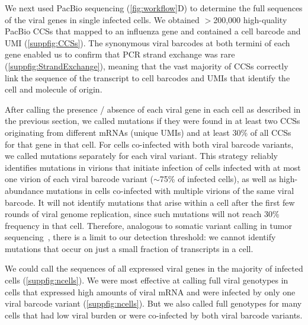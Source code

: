 \documentclass[]{asm-article}
\newcommand{\FIG}[1]{\autoref{fig:#1}}
\newcommand{\SUPPFIG}[1]{\autoref{suppfig:#1}}
\begin{document}
We next used PacBio sequencing (\FIG{workflow}D) to determine the full sequences of the viral genes in single infected cells.
We obtained $>$200,000 high-quality PacBio CCSs that mapped to an influenza gene and contained a cell barcode and UMI (\SUPPFIG{CCSs}).
The synonymous viral barcodes at both termini of each gene enabled us to confirm that PCR strand exchange was rare (\SUPPFIG{StrandExchange}), meaning that the vast majority of CCSs correctly link the sequence of the transcript to cell barcodes and UMIs that identify the cell and molecule of origin.

After calling the presence / absence of each viral gene in each cell as described in the previous section, we called mutations if they were found in at least two CCSs originating from different mRNAs (unique UMIs) and at least 30\% of all CCSs for that gene in that cell.
For cells co-infected with both viral barcode variants, we called mutations separately for each viral variant.
This strategy reliably identifies mutations in virions that initiate infection of cells infected with at most one virion of each viral barcode variant ($\sim$75\% of infected cells), as well as high-abundance mutations in cells co-infected with multiple virions of the same viral barcode.
It will not identify mutations that arise within a cell after the first few rounds of viral genome replication, since such mutations will not reach 30\% frequency in that cell.
Therefore, analogous to somatic variant calling in tumor sequencing~\cite{xu2014comparison, cibulskis2013sensitive}, there is a limit to our detection threshold: we cannot identify mutations that occur on just a small fraction of transcripts in a cell. 

We could call the sequences of all expressed viral genes in the majority of infected cells (\SUPPFIG{ncells}).
We were most effective at calling full viral genotypes in cells that expressed high amounts of viral mRNA and were infected by only one viral barcode variant (\SUPPFIG{ncells}).
But we also called full genotypes for many cells that had low viral burden or were co-infected by both viral barcode variants.
\end{document}
